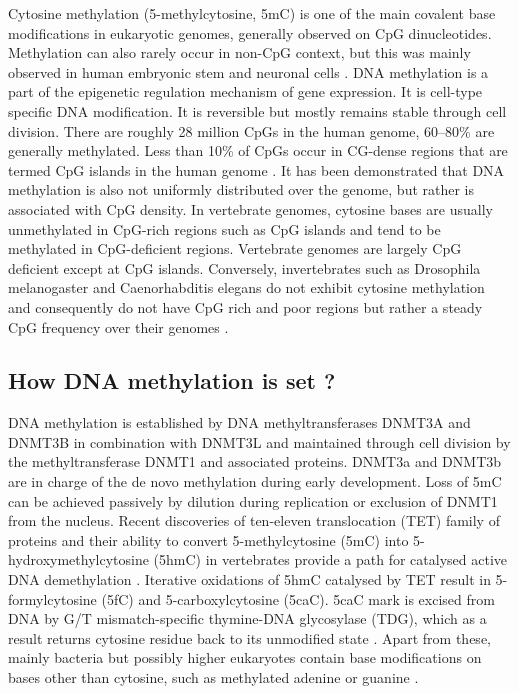 \documentclass[12pt,]{krantz}
\begin{document}
Cytosine methylation (5-methylcytosine, 5mC) is one of the main covalent base modifications in eukaryotic genomes, generally observed on CpG dinucleotides. Methylation can also rarely occur in non-CpG context, but this was mainly observed in human embryonic stem and neuronal cells \citep[\citet{Lister2013-vs}]{Lister2009-sd}. DNA methylation is a part of the epigenetic regulation mechanism of gene expression. It is cell-type specific DNA modification. It is reversible but mostly remains stable through cell division. There are roughly 28 million CpGs in the human genome, 60--80\% are generally methylated. Less than 10\% of CpGs occur in CG-dense regions that are termed CpG islands in the human genome \citep{Smith2013-jh}. It has been demonstrated that DNA methylation is also not uniformly distributed over the genome, but rather is associated with CpG density. In vertebrate genomes, cytosine bases are usually unmethylated in CpG-rich regions such as CpG islands and tend to be methylated in CpG-deficient regions. Vertebrate genomes are largely CpG deficient except at CpG islands. Conversely, invertebrates such as Drosophila melanogaster and Caenorhabditis elegans do not exhibit cytosine methylation and consequently do not have CpG rich and poor regions but rather a steady CpG frequency over their genomes \citep{Deaton2011-pm}.

\hypertarget{how-dna-methylation-is-set}{%
\subsection{How DNA methylation is set ?}\label{how-dna-methylation-is-set}}

DNA methylation is established by DNA methyltransferases DNMT3A and DNMT3B in combination with DNMT3L and maintained through cell division by the methyltransferase DNMT1 and associated proteins. DNMT3a and DNMT3b are in charge of the de novo methylation during early development. Loss of 5mC can be achieved passively by dilution during replication or exclusion of DNMT1 from the nucleus. Recent discoveries of ten-eleven translocation (TET) family of proteins and their ability to convert 5-methylcytosine (5mC) into 5-hydroxymethylcytosine (5hmC) in vertebrates provide a path for catalysed active DNA demethylation \citep{Tahiliani2009-ar}. Iterative oxidations of 5hmC catalysed by TET result in 5-formylcytosine (5fC) and 5-carboxylcytosine (5caC). 5caC mark is excised from DNA by G/T mismatch-specific thymine-DNA glycosylase (TDG), which as a result returns cytosine residue back to its unmodified state \citep{He2011-pw}. Apart from these, mainly bacteria but possibly higher eukaryotes contain base modifications on bases other than cytosine, such as methylated adenine or guanine \citep{Clark2011-sc}.
\end{document}
